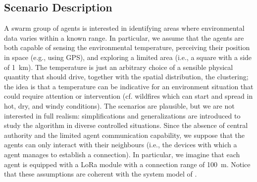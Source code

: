\subsection{Scenario Description}\label{s:scenario-description}
%
A swarm group of agents is interested in identifying areas
 where environmental data varies within a known range.
%
In particular, we assume that the agents are both
 capable of sensing the environmental temperature,
 perceiving their position in space (e.g., using GPS),
 and exploring a limited area (i.e., a square with a side of \SI{1}{\kilo\metre}).
%
The temperature is just an arbitrary choice of
 a sensible physical quantity
 that should drive, together with the spatial distribution,
 the clustering;
 the idea is that a temperature can be indicative for
 an environment situation that could require attention or intervention (cf. wildfires which can start and spread in hot, dry, and windy conditions).
%
The scenarios are plausible, but we are not interested in full realism: simplifications and generalizations are introduced to study the algorithm in diverse controlled situations.
%
Since the absence of central authority and the limited agent communication capability,
 we suppose that the agents can only interact with their neighbours
 (i.e., the devices with which a agent manages to establish a connection).
In particular, we imagine that each agent is equipped with a LoRa module with
 a connection range of \SI{100}{\metre}.
%
%
Notice that these assumptions are coherent with the system model of .

